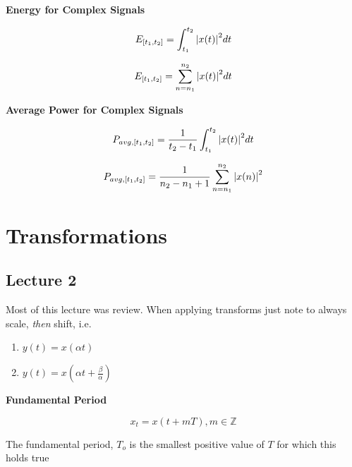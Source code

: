 \documentclass[../notes.tex]{subfiles}
\begin{document}
\begin{theorem}
	\textbf{Energy for Complex Signals} 

	\begin{equation}
		E_{[t_1, t_2]} = \int_{t_1}^{t_2} \abs{x(t)}^2 dt
		\label{eq:355:energy_CT}
	\end{equation}

	\begin{equation}
		E_{[t_1, t_2]} = \sum_{n=n_1}^{n_2} \abs{x(t)}^2 dt
		\label{eq:355:energy_DT}
	\end{equation}

	\textbf{Average Power for Complex Signals} 

	\begin{equation}
		P_{avg, [t_1, t_2]} = \frac{1}{t_2 - t_1} \int_{t_1}^{t_2} \abs{x(t)}^2 dt
		\label{eq:355:power_avg_CT}
	\end{equation}

	\begin{equation}
		P_{avg, [t_1, t_2]} = \frac{1}{n_2 - n_1 + 1} \sum_{n=n_1}^{n_2} \abs{x(n)}^2
		\label{eq:355:power_avg_DT}
	\end{equation}
		
\end{theorem}


\section{Transformations}

\subsection{Lecture 2}
Most of this lecture was review. When applying transforms just note to always scale, \textit{then} shift, i.e.

\begin{enumerate}
	\item $ y(t) = x(\alpha t) $ 
	\item $ y(t) = x(\alpha t+\frac{\beta}{\alpha}) $ 
\end{enumerate}


\begin{definition}
	\textbf{Fundamental Period} 


	\begin{equation}
		x_t = x(t+ mT), m \in \mathbb{Z}
		\label{eq:355:fundamental_period}
	\end{equation}

	The fundamental period, $ T_o $  is the smallest positive value of $ T $ for which this holds true
\end{definition}
\end{document}
